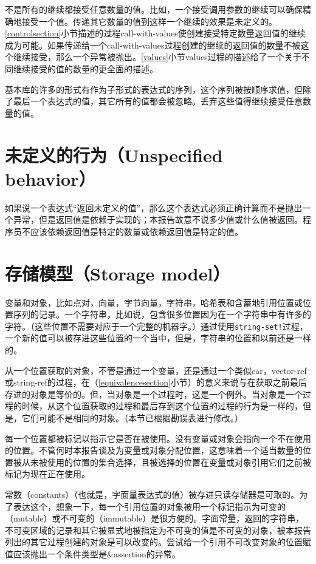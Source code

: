 不是所有的继续都接受任意数量的值。比如，一个接受调用参数的继续可以确保精确地接受一个值。传递其它数量的值到这样一个继续的效果是未定义的。\ref{controlsection}小节描述的过程{\cf call-with-values}使创建接受特定数量返回值的继续成为可能。如果传递给一个{\cf call-with-values}过程创建的继续的返回值的数量不被这个继续接受，那么一个异常被抛出。\ref{values}小节{\cf values}过程的描述给了一个关于不同继续接受的值的数量的更全面的描述。

基本库的许多的形式有作为子形式的表达式的序列，这个序列被按顺序求值，但除了最后一个表达式的值，其它所有的值都会被忽略。丢弃这些值得继续接受任意数量的值。

\section{未定义的行为（Unspecified behavior）}

\vest 如果说一个表达式“返回未定义的值”，那么这个表达式必须正确计算而不是抛出一个异常，但是返回值是依赖于实现的；本报告故意不说多少值或什么值被返回。程序员不应该依赖返回值是特定的数量或依赖返回值是特定的值。

\section{存储模型（Storage model）}
\label{storagemodel}

变量和对象，比如点对，向量，字节向量，字符串，哈希表和含蓄地引用位置或位置序列的记录。一个字符串，比如说，包含很多位置因为在一个字符串中有许多的字符。（这些位置不需要对应于一个完整的机器字。）通过使用{\tt string-set!}过程，一个新的值可以被存进这些位置的一个当中，但是，字符串的位置和以前还是一样的。

从一个位置获取的对象，不管是通过一个变量，还是通过一个类似{\cf car}，{\cf vector-ref}或{\cf string-ref}的过程，在（\ref{equivalencesection}小节）的意义来说与在获取之前最后存进的对象是等价的。但，当对象是一个过程时，这是一个例外。当对象是一个过程的时候，从这个位置获取的过程和最后存到这个位置的过程的行为是一样的，但是，它们可能不是相同的对象。（本节已根据勘误表进行修改。）

每一个位置都被标记以指示它是否在被使用。没有变量或对象会指向一个不在使用的位置。不管何时本报告谈及为变量或对象分配位置，这意味着一个适当数量的位置被从未被使用的位置的集合选择，且被选择的位置在变量或对象引用它们之前被标记为现在正在使用。

常数（constants）（也就是，字面量表达式的值）被存进只读存储器是可取的。为了表达这个，想象一下，每一个引用位置的对象被用一个标记指示为可变的（mutable）或不可变的（immutable）是很方便的。字面常量，返回的字符串，不可变区域的记录和其它被显式地被指定为不可变的值是不可变的对象，被本报告列出的其它过程创建的对象是可以改变的。尝试给一个引用不可改变对象的位置赋值应该抛出一个条件类型是{\cf\&assertion}的异常。

